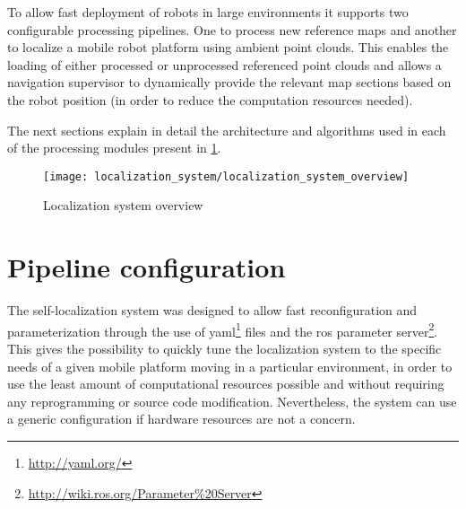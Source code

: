 To allow fast deployment of robots in large environments it supports two configurable processing pipelines. One to process new reference maps and another to localize a mobile robot platform using ambient point clouds. This enables the loading of either processed or unprocessed referenced point clouds and allows a navigation supervisor to dynamically provide the relevant map sections based on the robot position (in order to reduce the computation resources needed).

The next sections explain in detail the architecture and algorithms used in each of the processing modules present in \cref{fig:localization-system_localization-system-overview}.


\begin{figure}[H]
	\centering
	\texttt{[image: localization\_system/localization\_system\_overview]}
	\caption{Localization system overview}
	\label{fig:localization-system_localization-system-overview}
\end{figure}



\section{Pipeline configuration}

The self-localization system was designed to allow fast reconfiguration and parameterization through the use of yaml\footnote{\url{http://yaml.org/}} files and the \gls{ros} parameter server\footnote{\url{http://wiki.ros.org/Parameter\%20Server}}. This gives the possibility to quickly tune the localization system to the specific needs of a given mobile platform moving in a particular environment, in order to use the least amount of computational resources possible and without requiring any reprogramming or source code modification. Nevertheless, the system can use a generic configuration if hardware resources are not a concern.

